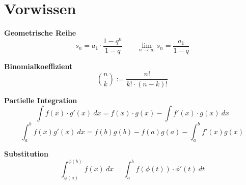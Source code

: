 \section*{Vorwissen}

 \textbf{Geometrische Reihe}
$$
    s_n = a_1 \cdot \frac{1-q^n}{1-q} \qquad \underset{n\to\infty}{\lim} s_n = \frac{a_1}{1-q}
$$

 \textbf{Binomialkoeffizient}
$$
    \binom{n}{k} := \frac{n!}{k!\cdot(n-k)!}
$$

\method \textbf{Partielle Integration}\\
$$\int f(x)\cdot g'(x)\ dx = f(x)\cdot g(x) - \int f'(x)\cdot g(x)\ dx$$
$$\int_a^bf(x)g'(x)\ dx = f(b)g(b) - f(a)g(a) -\int_a^b f'(x)g(x)$$

\method \textbf{Substitution}\\
$$\int_{\phi(a)}^{\phi(b)}f(x)\ dx = \int^b_af(\phi(t))\cdot\phi'(t)\ dt$$
